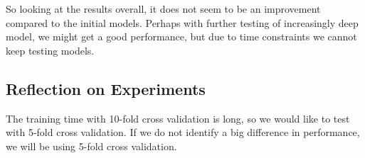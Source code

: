 So looking at the results overall, it does not seem to be an improvement compared to the initial models. Perhaps with further testing of increasingly deep model, we might get a good performance, but due to time constraints we cannot keep testing models.


\subsection{Reflection on Experiments}
The training time with 10-fold cross validation is long, so we would like to test with 5-fold cross validation. If we do not identify a big difference in performance, we will be using 5-fold cross validation. 
